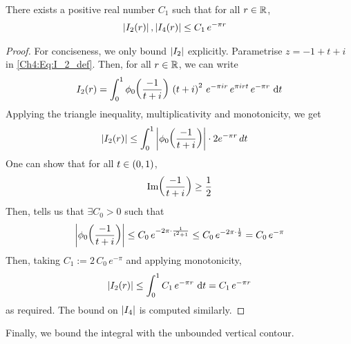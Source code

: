 \begin{boxlemma}\label{Ch4:Lemma:Bound_I2_I4}
    There exists a positive real number $C_1$ such that for all $r \in \mathbb{R}$,
    \begin{align*}
        \left\lvert I_2(r) \right\rvert, \left\lvert I_4(r) \right\rvert &\leq C_1 \, e^{-\pi r}
    \end{align*}
\end{boxlemma}
\begin{proof}
    For conciseness, we only bound $\left\lvert I_2 \right\rvert$ explicitly. Parametrise $z = -1 + t + i$ in \eqref{Ch4:Eq:I_2_def}. Then, for all $r \in \mathbb{R}$, we can write
    \begin{align*}
        I_2(r) = \int_{0}^{1}
            \phi_0\!\left( \frac{-1}{t + i} \right) \,
            \left( t + i \right)^2 \,
            e^{-\pi i r} \,
            e^{\pi i r t} \,
            e^{-\pi r} \,
            \operatorname{d}\!{t}
    \end{align*}
    Applying the triangle inequality, multiplicativity and monotonicity, we get
    \begin{align*}
        \left\lvert I_2(r) \right\rvert &\leq \int_{0}^{1} \left\lvert \phi_0\!\left( \frac{-1}{t + i} \right) \right\rvert \cdot 2e^{-\pi r} \, dt
    \end{align*}
    One can show that for all $t \in \left( 0, 1 \right)$,
    \begin{align*}
        \operatorname{Im}\!\left(  \frac{-1}{t + i}  \right) \geq \frac{1}{2}
    \end{align*}
    Then,  tells us that $\exists C_0 > 0$ such that
    \begin{align*}
        \left\lvert \phi_0\!\left( \frac{-1}{t + i} \right) \right\rvert
        \leq C_0 \, e^{-2 \pi \cdot \frac{1}{t^2 + 1}}
        \leq C_0 \, e^{-2\pi \cdot \frac{1}{2}} = C_0 \, e^{-\pi}
    \end{align*}
    Then, taking $C_1 := 2 \, C_0 \, e^{-\pi}$ and applying monotonicity,
    \begin{align*}
        \left\lvert I_2(r) \right\rvert \leq \int_{0}^{1} C_1 \, e^{-\pi r} \, \operatorname{d}\!{t} = C_1 \, e^{-\pi r}
    \end{align*}
    as required. The bound on $\left\lvert I_4 \right\rvert$ is computed similarly.
\end{proof}

Finally, we bound the integral with the unbounded vertical contour.

